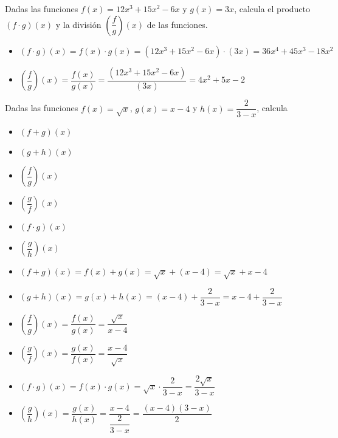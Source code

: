 \vspace{1cm}

\begin{ex}
	Dadas las funciones $f(x)=12x^3+15x^2-6x$ y $g(x)=3x$, calcula el producto $(f \cdot g)(x)$ y la división $(\dfrac{f}{g})(x)$ de las funciones.
	\begin{sol}
		\begin{itemize}
			\item $(f \cdot g)(x) = f(x) \cdot g(x) = (12x^3+15x^2-6x) \cdot(3x) = 36x^4+45x^3-18x^2$
			\item $(\dfrac{f}{g})(x) = \dfrac{f(x)}{g(x)} = \dfrac{(12x^3+15x^2-6x)}{(3x)} = 4x^2+5x-2$
		\end{itemize}
	\end{sol}
\end{ex}

\vspace{1cm}

\begin{ex}
	Dadas las funciones $f(x)=\sqrt{x}$, $g(x)=x-4$ y $h(x)=\dfrac{2}{3-x}$, calcula
	\begin{itemize}
		\item $(f+g)(x)$
		\item $(g+h)(x)$
		\item $(\dfrac{f}{g})(x)$
		\item $(\dfrac{g}{f})(x)$
		\item $(f\cdot g)(x)$
		\item $(\dfrac{g}{h})(x)$
	\end{itemize} 
	\begin{sol}
		\begin{itemize}
			\item $(f+g)(x) = f(x) + g(x) = \sqrt{x} + (x-4) = \sqrt{x} + x -4$
			\item $(g+h)(x) = g(x) + h(x) = (x-4) + \dfrac{2}{3-x} = x - 4 + \dfrac{2}{3-x}$
			\item $(\dfrac{f}{g})(x) = \dfrac{f(x)}{g(x)} = \dfrac{\sqrt{x}}{x-4}$
			\item $(\dfrac{g}{f})(x) = \dfrac{g(x)}{f(x)} = \dfrac{x-4}{\sqrt{x}}$
			\item $(f\cdot g)(x) = f(x) \cdot g(x) = \sqrt{x} \cdot \dfrac{2}{3-x} = \dfrac{2\sqrt{x}}{3-x}$
			\item $(\dfrac{g}{h})(x) = \dfrac{g(x)}{h(x)} = \dfrac{x-4}{\dfrac{2}{3-x}} = \dfrac{(x-4)(3-x)}{2}$
		\end{itemize}
	\end{sol}
\end{ex}
